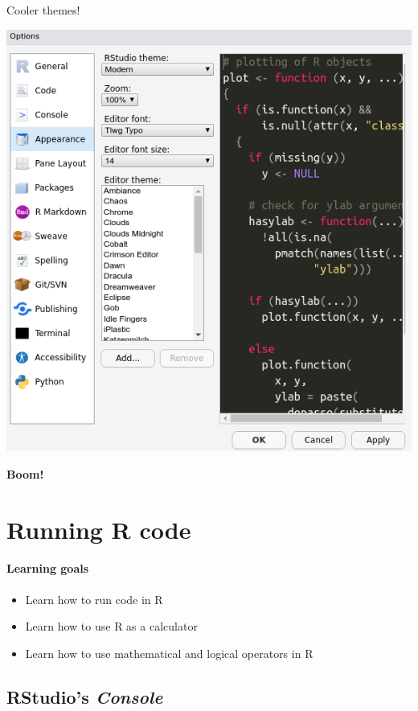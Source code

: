 \documentclass[
]{book}
\providecommand{\tightlist}{%
  \setlength{\itemsep}{0pt}\setlength{\parskip}{0pt}}
\begin{document}
Cooler themes!

\includegraphics{img/rstudio_theme.png}

\textbf{Boom!}

\hypertarget{running-r-code}{%
\chapter{Running R code}\label{running-r-code}}

\hypertarget{learning-goals}{%
\subsubsection*{Learning goals}\label{learning-goals}}

\begin{itemize}
\tightlist
\item
  Learn how to run code in R
\item
  Learn how to use R as a calculator
\item
  Learn how to use mathematical and logical operators in R
\end{itemize}

\hypertarget{rstudios-console}{%
\section*{\texorpdfstring{RStudio's \emph{Console}}{RStudio's Console}}\label{rstudios-console}}
\end{document}
